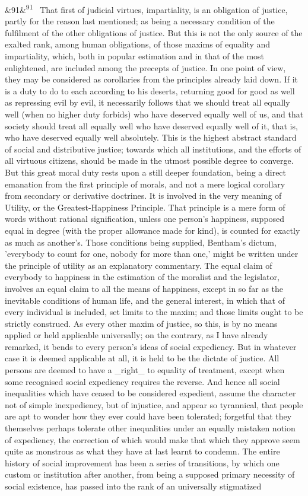 \documentclass[12pt]{article}
\newcommand{\para}[1][]{\par\noindent\ifx&#1&\else\textsuperscript{\footnotesize #1}~\fi}
\begin{document}
\para[91] That first of judicial virtues, impartiality, is an obligation of justice, partly for the reason last mentioned; as being a necessary condition of the fulfilment of the other obligations of justice. But this is not the only source of the exalted rank, among human obligations, of those maxims of equality and impartiality, which, both in popular estimation and in that of the most enlightened, are included among the precepts of justice. In one point of view, they may be considered as corollaries from the principles already laid down. If it is a duty to do to each according to his deserts, returning good for good as well as repressing evil by evil, it necessarily follows that we should treat all equally well (when no higher duty forbids) who have deserved equally well of us, and that society should treat all equally well who have deserved equally well of it, that is, who have deserved equally well absolutely. This is the highest abstract standard of social and distributive justice; towards which all institutions, and the efforts of all virtuous citizens, should be made in the utmost possible degree to converge. But this great moral duty rests upon a still deeper foundation, being a direct emanation from the first principle of morals, and not a mere logical corollary from secondary or derivative doctrines. It is involved in the very meaning of Utility, or the Greatest-Happiness Principle. That principle is a mere form of words without rational signification, unless one person's happiness, supposed equal in degree (with the proper allowance made for kind), is counted for exactly as much as another's. Those conditions being supplied, Bentham's dictum, 'everybody to count for one, nobody for more than one,' might be written under the principle of utility as an explanatory commentary. The equal claim of everybody to happiness in the estimation of the moralist and the legislator, involves an equal claim to all the means of happiness, except in so far as the inevitable conditions of human life, and the general interest, in which that of every individual is included, set limits to the maxim; and those limits ought to be strictly construed. As every other maxim of justice, so this, is by no means applied or held applicable universally; on the contrary, as I have already remarked, it bends to every person's ideas of social expediency. But in whatever case it is deemed applicable at all, it is held to be the dictate of justice. All persons are deemed to have a \_right\_ to equality of treatment, except when some recognised social expediency requires the reverse. And hence all social inequalities which have ceased to be considered expedient, assume the character not of simple inexpediency, but of injustice, and appear so tyrannical, that people are apt to wonder how they ever could have been tolerated; forgetful that they themselves perhaps tolerate other inequalities under an equally mistaken notion of expediency, the correction of which would make that which they approve seem quite as monstrous as what they have at last learnt to condemn. The entire history of social improvement has been a series of transitions, by which one custom or institution after another, from being a supposed primary necessity of social existence, has passed into the rank of an universally stigmatized 
\end{document}
